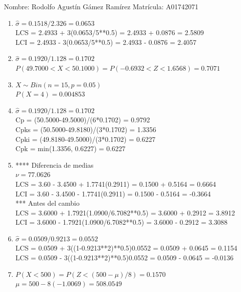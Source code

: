 \documentclass[8pt]{report}
\begin{document}
 \newpage

Nombre: \underline{\hspace*{.2in}}
Rodolfo Agustín Gámez Ramírez
\underline{\hspace*{.2in}} \quad Matr\'icula:\underline{\hspace*{.2in}}
A01742071
\underline{\hspace*{.2in}} \\

\begin{enumerate}
\item $\hat\sigma = 0.1518/2.326 = 0.0653$\\
LCS = 2.4933 + 3(0.0653/5**0.5) = 2.4933 + 0.0876 = 2.5809\\
LCI = 2.4933 - 3(0.0653/5**0.5) = 2.4933 - 0.0876 = 2.4057
\item $\hat\sigma = 0.1920/1.128 = 0.1702$\\
$P(49.7000 < X < 50.1000) = P(-0.6932 < Z < 1.6568) = 0.7071$\\
\item $X \sim Bin(n=15, p=0.05)$\\
$P(X = 4) = 0.004853$
\item $\hat\sigma = 0.1920/1.128 = 0.1702$\\
Cp = (50.5000-49.5000)/(6*0.1702) = 0.9792\\
Cpks = (50.5000-49.8180)/(3*0.1702) = 1.3356\\
Cpki = (49.8180-49.5000)/(3*0.1702) = 0.6227\\
Cpk = min(1.3356, 0.6227) = 0.6227
\item **** Diferencia de medias\\
$\nu = 77.0626$\\
LCS = 3.60 - 3.4500 + 1.7741(0.2911) = 0.1500 + 0.5164 = 0.6664\\
LCI = 3.60 - 3.4500 - 1.7741(0.2911) = 0.1500 - 0.5164 = -0.3664\\
*** Antes del cambio\\
LCS = 3.6000 + 1.7921(1.0900/6.7082**0.5) = 3.6000 + 0.2912 = 3.8912\\
LCI = 3.6000 - 1.7921(1.0900/6.7082**0.5) = 3.6000 - 0.2912 = 3.3088\\
\item $\hat\sigma = 0.0509/0.9213 = 0.0552$\\
LCS = 0.0509 + 3((1-0.9213**2)**0.5)0.0552 = 0.0509 + 0.0645 = 0.1154\\
LCS = 0.0509 - 3((1-0.9213**2)**0.5)0.0552 = 0.0509 - 0.0645 = -0.0136
\item $P(X < 500) = P(Z < (500-\mu)/8) = 0.1570$\\
$\mu = 500 - 8(-1.0069) = 508.0549$\\
\end{enumerate}
\end{document}
